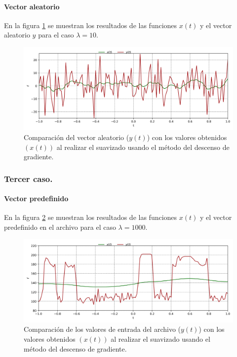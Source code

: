 \paragraph{Vector aleatorio}

En la figura \ref{fig:lambda_10} se muestran los resultados de las funciones $x(t)$ y el vector aleatorio $y$ para el caso $\lambda=10$.

\begin{figure}[H]
    \centering
    \includegraphics[width=17cm]{Graphics/Problema_3/lambda_10.png}
    \caption{Comparación del vector aleatorio ($y(t)$) con los valores obtenidos $(x(t))$ al realizar el suavizado usando el método del descenso de gradiente.}
    \label{fig:lambda_10}
\end{figure}

\subsubsection{Tercer caso.}

\paragraph{Vector predefinido}

En la figura \ref{fig:lambda_1000_test} se muestran los resultados de las funciones $x(t)$ y el vector predefinido en el archivo  para el caso $\lambda=1000$.

\begin{figure}[H]
    \centering
    \includegraphics[width=17cm]{Graphics/Problema_3/lambda_1000_test.png}
    \caption{Comparación de los valores de entrada del archivo  ($y(t)$) con los valores obtenidos $(x(t))$ al realizar el suavizado usando el método del descenso de gradiente.}
    \label{fig:lambda_1000_test}
\end{figure}

